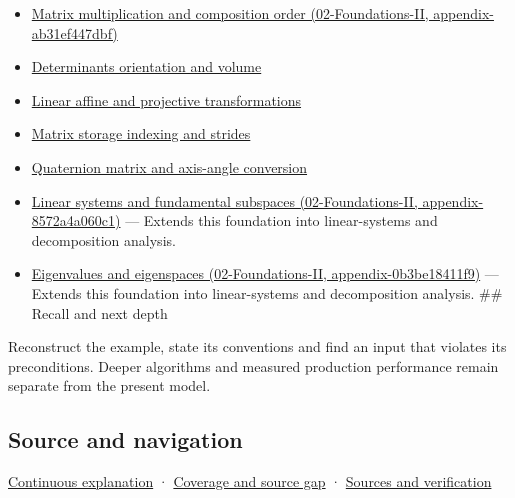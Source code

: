 \begin{itemize}
\tightlist
\item
  \href{}{Matrix multiplication and composition order (02-Foundations-II, appendix-ab31ef447dbf)}
\item
  \hyperref[appendix-da478be01d02]{Determinants orientation and volume}
\item
  \hyperref[appendix-0bf0ca73f735]{Linear affine and projective transformations}
\item
  \hyperref[appendix-ffdc1d4e5350]{Matrix storage indexing and strides}
\item
  \hyperref[appendix-26d8da71f6c4]{Quaternion matrix and axis-angle conversion}
\item
  \href{}{Linear systems and fundamental subspaces (02-Foundations-II, appendix-8572a4a060c1)} --- Extends this foundation into linear-systems and decomposition analysis.
\item
  \href{}{Eigenvalues and eigenspaces (02-Foundations-II, appendix-0b3be18411f9)} --- Extends this foundation into linear-systems and decomposition analysis. \#\# Recall and next depth
\end{itemize}

Reconstruct the example, state its conventions and find an input that violates its preconditions. Deeper algorithms and measured production performance remain separate from the present model.

\subsection{Source and navigation}\label{source-and-navigation}

\href{Continuous\%20Notes/Computing\%20Foundations\%20-\%20From\%20Bits\%20to\%20C++\%20and\%20Systems\%20APIs\#Keep\%20the\%20promises\%20visible\%20while\%20moving\%20between\%20representations}{Continuous explanation} · \hyperref[appendix-fd090d982a15]{Coverage and source gap} · \hyperref[appendix-a103e7846d21]{Sources and verification}
